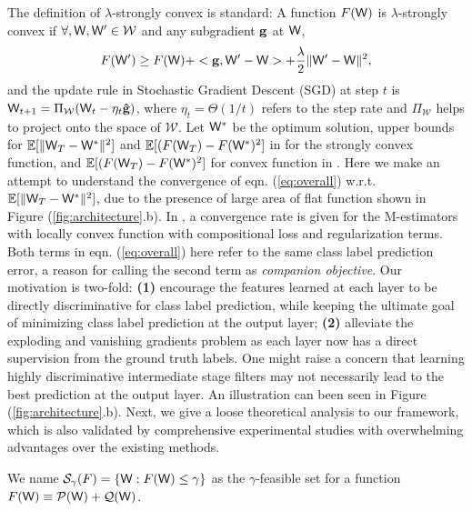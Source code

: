 \documentclass{article} %
\newcommand{\cW}{{\bf \mathsf{W}}}
\newcommand{\cg}{{\bf g}}
\newcommand{\sg}{{\bf \hat{g}}}
\newcommand{\cE}{{\mathbb{E}}}
\newcommand{\aP}{{\mathcal{P}}}
\newcommand{\aQ}{{\mathcal{Q}}}
\newenvironment{definition}[1][Definition]{\begin{trivlist}
\item[\hskip \labelsep {\bfseries #1}]}{\end{trivlist}}
\begin{document}
The definition of $\lambda$-strongly convex is standard: A function $F(\cW)$ is $\lambda$-strongly convex if $\forall, \cW, \cW' \in \mathcal{W}$ and any subgradient $\cg$ at $\cW$,
\begin{equation}
  F(\cW') \ge F(\cW) + <\cg, \cW'-\cW> + \frac{\lambda}{2} \lVert \cW'-\cW \rVert^2,
\label{eq:overall}	
\end{equation}
and the update rule in Stochastic Gradient Descent (SGD) at step $t$ is $\cW_{t+1} = \Pi_{\mathcal{W}}(\cW_{t} - \eta_t \sg)$,
where $\eta_t=\Theta(1/t)$ refers to the step rate and $\Pi_{\mathcal{W}}$ helps to project onto the space of $\mathcal{W}$. Let $\cW^{*}$ be the optimum solution, upper bounds for $\cE[\lVert \cW_T-\cW^{*} \rVert^2]$ and 
$\cE[(F(\cW_T)-F(\cW^{*})^2]$ in \cite{Rakhlin12} for the strongly convex function, and $\cE[(F(\cW_T)-F(\cW^{*})^2]$ for convex function in \cite{Shamir13}.
Here we make an attempt to understand the convergence of eqn. (\ref{eq:overall}) w.r.t. $\cE[\lVert \cW_T-\cW^{*} \rVert^2]$, due to the presence of large area of flat function shown in Figure (\ref{fig:architecture}.b).
In \cite{Loh13}, a convergence rate is given for the M-estimators with locally convex function with compositional loss and regularization terms. Both terms in  eqn. (\ref{eq:overall}) here refer to the same class label prediction error, a reason for calling the second term as {\em companion objective}. Our motivation is two-fold: {\bf (1)} encourage the features learned at each layer to be directly discriminative for class label prediction, while keeping the ultimate goal of minimizing class label prediction at the output layer; {\bf (2)} alleviate the exploding and vanishing gradients problem as each layer now has a direct supervision from the ground truth labels. One might raise a concern that learning highly discriminative intermediate stage filters may not necessarily lead to the best prediction at the output layer.
An illustration can been seen in Figure (\ref{fig:architecture}.b).
Next, we give a loose theoretical analysis to our framework, which is also validated by comprehensive experimental studies with overwhelming advantages over the existing methods.

\begin{definition}
We name $\mathcal{S}_{\gamma}(F)=\{\cW: F(\cW) \le \gamma \}$ as the $\gamma$-feasible set for a function $F(\cW) \equiv \aP(\cW) + \aQ(\cW)$.
\end{definition}
\end{document}
